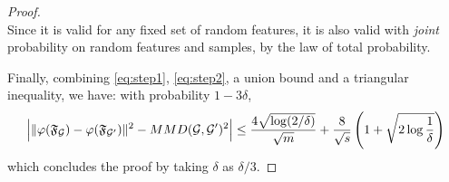 \begin{proof}
\begin{equation}
\end{equation}
Since it is valid for any fixed set of random features, it is also valid with \emph{joint} probability on random features and samples, by the law of total probability.

Finally, combining \eqref{eq:step1}, \eqref{eq:step2}, a union bound and a triangular inequality, we have: with probability $1-3\delta$,
\begin{equation}
\Big|\|\varphi(\mathfrak{F}_{\mathcal{G}}) - \varphi(\mathfrak{F}_{\mathcal{G}'})\|^2 - MMD(\mathcal{G},\mathcal{G}')^2 \Big| \leq \frac{4 \sqrt{\log (2/\delta)}}{\sqrt{m}} + \frac{8}{\sqrt{{s}}}\left(1+\sqrt{2\log\frac{1}{\delta}}\right)
\end{equation}
which concludes the proof by taking $\delta$ as $\delta/3$.

\end{proof}


